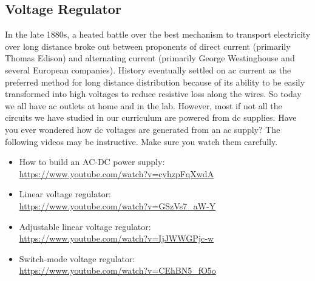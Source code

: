 \documentclass[letterpaper, 11pt]{article}
\begin{document}
\subsection{Voltage Regulator}
In the late 1880s, a heated battle over the best mechanism to transport electricity over long distance broke out between proponents of direct current (primarily Thomas Edison) and alternating current (primarily George Westinghouse and several European companies). History eventually settled on ac current as the preferred method for long distance distribution because of its ability to be easily transformed into high voltages to reduce resistive loss along the wires. So today we all have ac outlets at home and in the lab. However, most if not all the circuits we have studied in our curriculum are powered from dc supplies. Have you ever wondered how dc voltages are generated from an ac supply? The following videos may be instructive. Make sure you watch them carefully. 

\begin{itemize}[itemsep=0.1ex]
	\item How to build an AC-DC power supply:\\ \url{https://www.youtube.com/watch?v=cyhzpFqXwdA} 
	\item Linear voltage regulator:\\ \url{https://www.youtube.com/watch?v=GSzVs7_aW-Y}
	\item Adjustable linear voltage regulator:\\  \url{https://www.youtube.com/watch?v=IjJWWGPjc-w}
	\item Switch-mode voltage regulator:\\ \url{https://www.youtube.com/watch?v=CEhBN5_fO5o}
\end{itemize}
\end{document}
